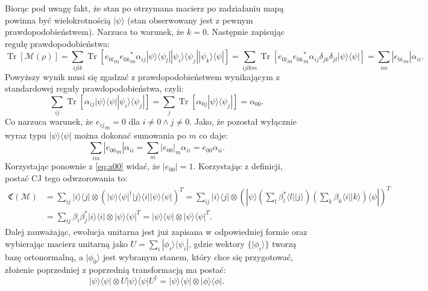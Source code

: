 \documentclass[10pt]{article} %
\DeclareMathOperator{\Trs}{Tr}
\newcommand{\Ket}[1]{|#1\rangle}
\newcommand{\Bra}[1]{\langle#1|}
\newcommand{\KP}{\Ket{\psi}}
\newcommand{\BP}{\Bra{\psi}}
\newcommand{\MCJ}{\mathfrak{C}}
\begin{document}
Biorąc pod uwagę fakt, że stan po otrzymana macierz po zadziałaniu mapą powinna być wielokrotnością $\Ket{\psi}$ (stan obserwowany jest z pewnym prawdopodobieństwem). Narzuca to warunek, że $k = 0$. Następnie zapisując regułę prawdopodobieństwa:
\begin{equation}
\Trs\left[ \mathcal{M}(\rho) \right] = \sum_{ijlk} \Trs \left[ {e_{0l}}_m{e_{0k}}_m^*\alpha_{ij} \Ket{\psi}\Bra{\psi_l} \Ket{\psi_i}\Bra{\psi_j} \Ket{\psi_k}\Bra{\psi}\right] =
\sum_{ijlkm} \Trs \left [ {e_{0l}}_m{e_{0k}}_m^*\alpha_{ij}\delta_{jk}\delta_{jl} \Ket{\psi}\Bra{\psi} \right] = \sum_{im} |{e_{0i}}_m| \alpha_{ii}.
\end{equation} 
Powyższy wynik musi się zgadzać z prawdopodobieństwem wynikającym z standardowej reguły prawdopodobieństwa, czyli:
\begin{equation}
\label{eq:a00}
\sum_{ij} \Trs \left[ \alpha_{ij} \Ket{\psi}\Bra{\psi} \Ket{\psi_i}\Bra{\psi_j}\right] = \sum_{j} \Trs \left[ \alpha_{0j} \Ket{\psi}\Bra{\psi_j} \right] = \alpha_{00}.
\end{equation}
Co narzuca warunek, że ${e_{ij}}_m = 0$ dla $i \neq 0 \land j \neq 0$. Jako, że pozostał wyłącznie wyraz typu $\Ket{\psi}\Bra{\psi}$ można dokonać sumowania po $m$ co daje:
\begin{equation}
\sum_{im} |{e_{00}}_m| \alpha_{ii} = \sum_{m} |e_{00}|_m \alpha_{ii} = e_{00} \alpha_{ii}.
\end{equation}
Korzystając ponownie z \eqref{eq:a00} widać, że $|e_{00}| = 1$.
Korzystając z definicji, postać CJ tego odwzorowania to:
\begin{equation}
\begin{split}
\MCJ(\mathcal{M}) &= \sum_{ij} \Ket{i}\Bra{j} \otimes (\Ket{\psi}\Bra{\psi}^\dag \Ket{j}\Bra{i} \Ket{\psi}\Bra{\psi})^T = \sum_{ij}\Ket{i}\Bra{j}  \otimes (\Ket{\psi}\left(\sum_l \beta_{l}^* \Bra{l}\Ket{j}\right)\left(\sum_k\beta_k\Bra{i}\Ket{k}\right)\Bra{\psi})^T \\&=  \sum_{ij} \beta_i \beta_j^* \Ket{i}\Bra{i} \otimes \KP\BP^T = \KP\BP \otimes \KP\BP^T.
\end{split}
\end{equation} Dalej zauważając, ewolucja unitarna jest już zapisana w odpowiedniej formie oraz wybierając macierz unitarną jako
$U = \sum_i \Ket{\phi_i}\Bra{\psi_i}$, gdzie wektory $\{ \Ket{\phi_i} \}$ tworzą bazę ortonormalną, a $\Ket{\phi_0}$ jest wybranym stanem, który chce się przygotować, złożenie poprzedniej z poprzednią transformacją ma postać:
\begin{equation}
\Ket{\psi}\Bra{\psi}\otimes U \Ket{\psi}\Bra{\psi} U^\dag = \Ket{\psi}\Bra{\psi}\otimes \Ket{\phi}\Bra{\phi}.
\end{equation}
\end{document}
